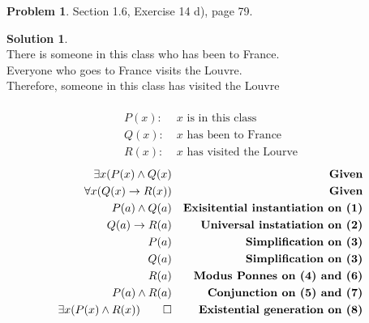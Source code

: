 \documentclass{article}
\theoremstyle{definition}
\newtheorem{problem}{Problem}
\newtheorem*{solution}{Solution}
\begin{document}
\begin{problem} Section 1.6, Exercise 14 d), page 79.  
\end{problem}
\begin{solution}\ \\
There is someone in this class who has been to France. \\
Everyone who goes to France visits the Louvre. \\
Therefore, someone in this class has visited the Louvre \\ \ \\
\begin{align*}
  P(x):&\; x \text{ is in this class} \\
  Q(x):&\; x \text{ has been to France} \\
  R(x):&\; x \text{ has visited the Lourve}
\end{align*}
\setcounter{equation}{0}
\begin{align}
  \exists x(P(x) \land Q(x)& &\textbf{Given} \\
  \forall x(Q(x) \rightarrow R(x))& &\textbf{Given} \\
  P(a) \land Q(a)& &\textbf{Exisitential instantiation on (1)} \\
  Q(a) \rightarrow R(a)& &\textbf{Universal instatiation on (2)} \\
  P(a)& &\textbf{Simplification on (3)} \\
  Q(a)& &\textbf{Simplification on (3)} \\
  R(a)& &\textbf{Modus Ponnes on (4) and (6)} \\
  P(a) \land R(a)& &\textbf{Conjunction on (5) and (7)} \\
  \exists x(P(x) \land R(x)) \qed& &\textbf{Existential generation on (8)}
\end{align}
\end{solution}
\end{document}
